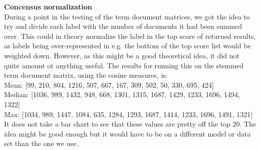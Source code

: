 \textbf{Concensus normalization} \\
During a point in the testing of the term document matrices, we got the idea to try and divide each label with 
the number of documents it had been summed over. This could in theory normalize the label in the top score of 
returned results, as labels being over-represented in e.g. the bottom of the top score list would be weighted down. 
However, as this might be a good theoretical idea, it did not quite amount ot anything useful. The results for 
running this on the stemmed term document matrix, using the cosine measures, is: \\
{\small
Mean: [99, 210, 804, 1216, 507, 667, 167, 309, 502, 50, 330, 695, 424] \\
Median: [1036, 989, 1432, 948, 668, 1301, 1315, 1687, 1429, 1233, 1696, 1494, 1322] \\
Max: [1034, 989, 1447, 1084, 635, 1284, 1293, 1687, 1414, 1233, 1696, 1491, 1321] \\
}
It does not take a bar chart to see that these values are pretty off the top 20. The idea might be good enough but it would have to be on a different model or data set than the one we use.

